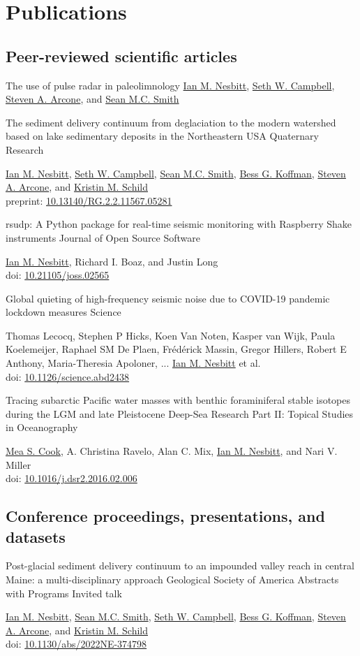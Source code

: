 \documentclass[a4paper,12pt,sans,colorlinks]{moderncv}
\newcommand{\me}{\href{https://www.iannesbitt.org}{Ian M. Nesbitt}}
\newcommand{\seth}{\href{https://www.alpinesciences.net}{Seth W. Campbell}}
\newcommand{\sean}{\href{https://umaine.edu/earthclimate/people/sean-m-c-smith/}{Sean M.C. Smith}}
\newcommand{\bess}{\href{https://www.colby.edu/directory/profile/bess.koffman/}{Bess G. Koffman}}
\newcommand{\stevearcone}{\href{https://engineering.dartmouth.edu/community/faculty/steven-arcone}{Steven A. Arcone}}
\newcommand{\kristin}{\href{https://climatechange.umaine.edu/people/kristin-schild/}{Kristin M. Schild}}
\newcommand{\richard}{Richard I. Boaz}
\newcommand{\mea}{\href{https://geosciences.williams.edu/profile/msc1/}{Mea S. Cook}}
\newcommand{\doi}[1]{%
    \href{https://doi.org/#1}{#1}
}
\begin{document}
\section{Publications}

\subsection{Peer-reviewed scientific articles}

{The use of pulse radar in paleolimnology}
{}
{}
{}
{
    \me{}, \seth{}, \stevearcone{}, and \sean{}
}

{The sediment delivery continuum from deglaciation to the modern
watershed based on lake sedimentary deposits in the Northeastern
USA}
{Quaternary Research}
{}
{}
{
    \me{}, \seth{}, \sean{}, \bess{}, \stevearcone{},
    and \kristin{}
    \\
    preprint: \doi{10.13140/RG.2.2.11567.05281}
}

{rsudp: A Python package for real-time seismic
monitoring with Raspberry Shake instruments}
{Journal of Open Source Software}
{}
{}
{
    \me{}, \richard, and Justin Long
    \\
    doi: \doi{10.21105/joss.02565}
}

{Global quieting of high-frequency seismic noise
due to COVID-19 pandemic lockdown measures}
{Science}
{}
{}
{
    Thomas Lecocq, Stephen P Hicks, Koen Van Noten,
    Kasper van Wijk, Paula Koelemeijer, Raphael SM De Plaen,
    Frédérick Massin, Gregor Hillers, Robert E Anthony,
    Maria-Theresia Apoloner, ... \me{} et al.
    \\
    doi: \doi{10.1126/science.abd2438}
}

{Tracing subarctic Pacific water masses with benthic
foraminiferal stable isotopes during the LGM and late
Pleistocene}
{Deep-Sea Research Part II: Topical Studies in Oceanography}
{}
{}
{
    \mea{}, A. Christina Ravelo, Alan C. Mix, \me{},
    and Nari V. Miller
    \\
    doi: \doi{10.1016/j.dsr2.2016.02.006}
}


\newpage
\subsection{Conference proceedings, presentations, and datasets}

{Post-glacial sediment delivery continuum to an impounded
valley reach in central Maine: a multi-disciplinary approach}
{Geological Society of America Abstracts with Programs}
{}
{Invited talk}
{
    \me{}, \sean{}, \seth{}, \bess{}, \stevearcone{}, and \kristin{}
    \\
    doi: \doi{10.1130/abs/2022NE-374798}
}
\end{document}
